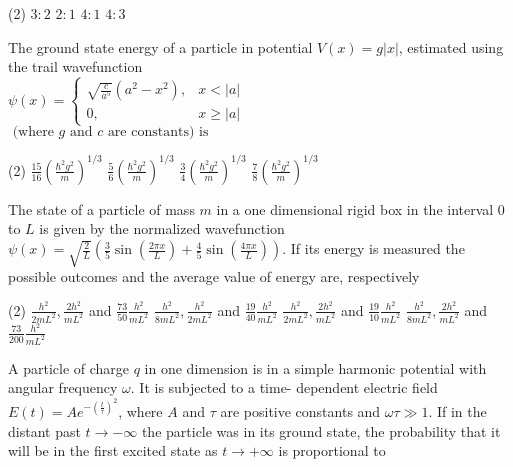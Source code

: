 \begin{enumerate}
\begin{minipage}{\textwidth}
\end{minipage}
\begin{tasks}(2)
	\task[\textbf{A.}] $3: 2$
	\task[\textbf{B.}]$2: 1$
	\task[\textbf{C.}]$4: 1$
	\task[\textbf{D.}]$4: 3$
\end{tasks}
\begin{minipage}{\textwidth}
	\item The ground state energy of a particle in potential $V(x)=g|x|$, estimated using the trail wavefunction\\
	$\psi(x)= \begin{cases}\sqrt{\frac{c}{a^{5}}}\left(a^{2}-x^{2}\right), & x<|a| \\ 0, & x \geq|a|\end{cases}$\\
	$\text { (where } g \text { and } c \text { are constants) is }$
\end{minipage}
\begin{tasks}(2)
	\task[\textbf{A.}] $\frac{15}{16}\left(\frac{\hbar^{2} g^{2}}{m}\right)^{1 / 3}$
	\task[\textbf{B.}]$\frac{5}{6}\left(\frac{\hbar^{2} g^{2}}{m}\right)^{1 / 3}$
	\task[\textbf{C.}] $\frac{3}{4}\left(\frac{\hbar^{2} g^{2}}{m}\right)^{1 / 3}$
	\task[\textbf{D.}] $\frac{7}{8}\left(\frac{\hbar^{2} g^{2}}{m}\right)^{1 / 3}$
\end{tasks}
\begin{minipage}{\textwidth}
	\item The state of a particle of mass $m$ in a one dimensional rigid box in the interval 0 to $L$ is given by the normalized wavefunction $\psi(x)=\sqrt{\frac{2}{L}}\left(\frac{3}{5} \sin \left(\frac{2 \pi x}{L}\right)+\frac{4}{5} \sin \left(\frac{4 \pi x}{L}\right)\right)$. If its energy is measured the possible outcomes and the average value of energy are, respectively
\end{minipage}
\begin{tasks}(2)
	\task[\textbf{A.}] $\frac{h^{2}}{2 m L^{2}}, \frac{2 h^{2}}{m L^{2}}$ and $\frac{73}{50} \frac{h^{2}}{m L^{2}}$
	\task[\textbf{B.}] $\frac{h^{2}}{8 m L^{2}}, \frac{h^{2}}{2 m L^{2}}$ and $\frac{19}{40} \frac{h^{2}}{m L^{2}}$
	\task[\textbf{C.}]$\frac{h^{2}}{2 m L^{2}}, \frac{2 h^{2}}{m L^{2}}$ and $\frac{19}{10} \frac{h^{2}}{m L^{2}}$
	\task[\textbf{D.}]$\frac{h^{2}}{8 m L^{2}}, \frac{2 h^{2}}{m L^{2}}$ and $\frac{73}{200} \frac{h^{2}}{m L^{2}}$
\end{tasks}
\begin{minipage}{\textwidth}
	\item A particle of charge $q$ in one dimension is in a simple harmonic potential with angular frequency $\omega .$ It is subjected to a time- dependent electric field $E(t)=A e^{-\left(\frac{t}{\tau}\right)^{2}}$, where $A$ and $\tau$ are positive constants and $\omega \tau \gg 1$. If in the distant past $t \rightarrow-\infty$ the particle was in its ground state, the probability that it will be in the first excited state as $t \rightarrow+\infty$ is proportional to

\end{minipage}
\end{enumerate}
